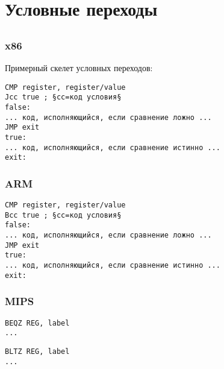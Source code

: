 \section{Условные переходы}
\label{sec:Jcc}






\subsection{\Conclusion{}}

\subsubsection{x86}

Примерный скелет условных переходов:

\begin{lstlisting}[caption=x86,style=customasmx86]
CMP register, register/value
Jcc true ; §cc=код условия§
false:
... код, исполняющийся, если сравнение ложно ...
JMP exit 
true:
... код, исполняющийся, если сравнение истинно ...
exit:
\end{lstlisting}

\subsubsection{ARM}

\begin{lstlisting}[caption=ARM,style=customasmARM]
CMP register, register/value
Bcc true ; §cc=код условия§
false:
... код, исполняющийся, если сравнение ложно ...
JMP exit 
true:
... код, исполняющийся, если сравнение истинно ...
exit:
\end{lstlisting}

\subsubsection{MIPS}

\begin{lstlisting}[caption=Проверка на ноль,style=customasmMIPS]
BEQZ REG, label
...
\end{lstlisting}

\begin{lstlisting}[caption=Меньше ли нуля?,style=customasmMIPS]
BLTZ REG, label
...
\end{lstlisting}

